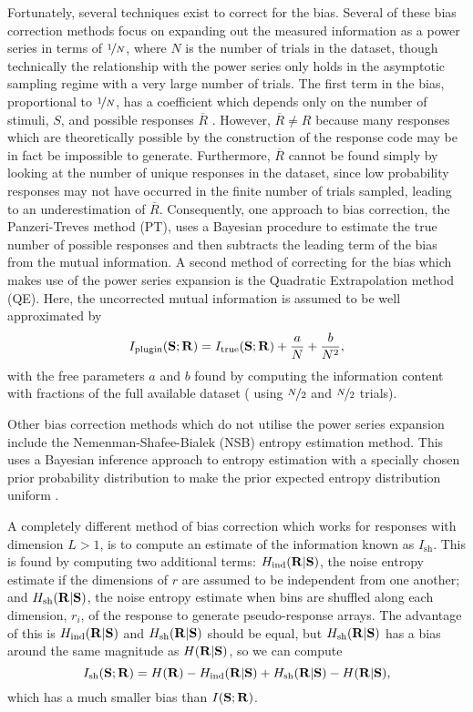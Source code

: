 Fortunately, several techniques exist to correct for the bias.
Several of these bias correction methods focus on expanding out the measured information as a power series \cite{Miller1955,Treves1995} in terms of $\nicefrac{1}{N}$, where $N$ is the number of trials in the dataset, though technically the relationship with the power series only holds in the asymptotic sampling regime with a very large number of trials. The first term in the bias, proportional to $\nicefrac{1}{N}$, has a coefficient which depends only on the number of stimuli, $S$, and possible responses $\overline{R}$ . However, $\overline{R} \neq R$ because many responses which are theoretically possible by the construction of the response code may be in fact be impossible to generate. Furthermore, $\overline{R}$ cannot be found simply by looking at the number of unique responses in the dataset, since low probability responses may not have occurred in the finite number of trials sampled, leading to an underestimation of $\overline{R}$.
Consequently, one approach to bias correction, the Panzeri-Treves method \cite{Panzeri1996} (PT), uses a Bayesian procedure to estimate the true number of possible responses and then subtracts the leading term of the bias from the mutual information.
A second method of correcting for the bias which makes use of the power series expansion is the Quadratic Extrapolation method \cite{Strong1998} (QE). Here, the uncorrected mutual information is assumed to be well approximated by
$$
I_{\text{plugin}}(\mathbf{S};\mathbf{R}) = I_{\text{true}}(\mathbf{S};\mathbf{R}) + \frac{a}{N} + \frac{b}{N^2}
,$$
with the free parameters $a$ and $b$ found by computing the information content with fractions of the full available dataset (\ie{} using $\nicefrac{N}{2}$ and $\nicefrac{N}{2}$ trials).

Other bias correction methods which do not utilise the power series expansion include the Nemenman-Shafee-Bialek (NSB) entropy estimation method.
This uses a Bayesian inference approach to entropy estimation with a specially chosen prior probability distribution to make the prior expected entropy distribution uniform \cite{Nemenman2004}.

A completely different method of bias correction which works for responses with dimension $L > 1$, is to compute an estimate of the information known as $I_{\text{sh}}$.
This is found \cite{Montemurro2007} by computing two additional terms: $H_\text{ind}( \mathbf{R} | \mathbf{S} )$, the noise entropy estimate if the dimensions of $r$ are assumed to be independent from one another; and $H_\text{sh}( \mathbf{R} | \mathbf{S} )$, the noise entropy estimate when bins are shuffled along each dimension, $r_i$, of the response to generate pseudo-response arrays. The advantage of this is $H_\text{ind}( \mathbf{R} | \mathbf{S} )$ and $H_\text{sh}( \mathbf{R} | \mathbf{S} )$ should be equal, but $H_\text{sh}( \mathbf{R} | \mathbf{S} )$ has a bias around the same magnitude as $H( \mathbf{R} | \mathbf{S} )$, so we can compute
$$
I_{\text{sh}}(\mathbf{S};\mathbf{R}) = H( \mathbf{R} ) - H_\text{ind}( \mathbf{R} | \mathbf{S} ) + H_\text{sh}( \mathbf{R} | \mathbf{S} ) - H( \mathbf{R} | \mathbf{S} )
,$$
which has a much smaller bias than $I(\mathbf{S};\mathbf{R})$.

